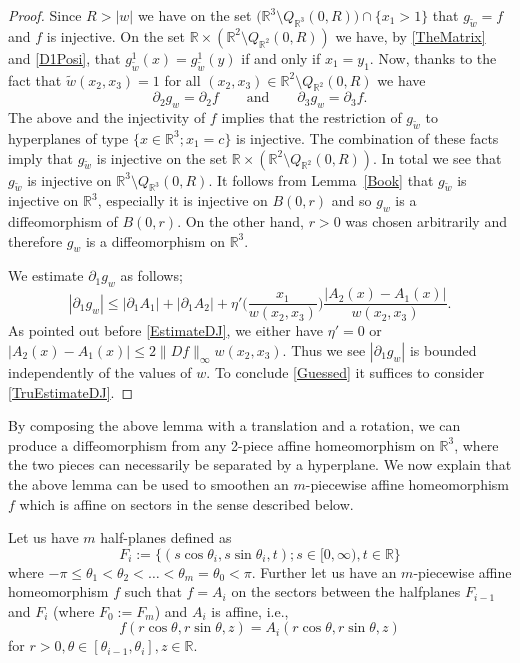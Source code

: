 \documentclass[12pt,a4paper]{amsart}
\theoremstyle{plain}
\theoremstyle{definition}
\numberwithin{equation}{section}
\def\er{\mathbb R}
\begin{document}
\begin{proof}
		Since $R > |w|$ we have on the set $\big(\er^3\setminus Q_{\er^3}(0,R)\big) \cap \{x_1>1\}$ that $g_{\tilde w} = f$ and $f$ is injective. On the set $\er\times(\er^2\setminus Q_{\er^2}(0,R))$ we have, by \eqref{TheMatrix} and  \eqref{D1Posi}, that $g_{\tilde{w}}^1(x) = g_{\tilde{w}}^1(y)$ if and only if $x_1 = y_1$. Now, thanks to the fact that $\tilde{w}(x_2,x_3) =1$ for all $(x_2,x_3)\in \er^2\setminus Q_{\er^2}(0,R)$ we have
		\begin{equation}\label{Sunlight}
			\partial_2 g_w = \partial_2f \qquad \text{and}\qquad \partial_3 g_w = \partial_3f.
		\end{equation}
		The above and the injectivity of $f$ implies that the restriction of $g_{\tilde{w}}$ to hyperplanes of type $\{x\in \er^3; x_1 = c\}$ is injective. The combination of these facts imply that $g_{\tilde{w}}$ is injective on the set $\er\times(\er^2\setminus Q_{\er^2}(0,R))$. In total we see that $g_{\tilde{w}}$ is injective on $\er^3\setminus Q_{\er^3}(0,R)$. It follows from Lemma~\ref{Book} that $g_{\tilde{w}}$ is injective on $\er^3$, especially it is injective on $B(0,r)$ and so $g_{w}$ is a diffeomorphism of $B(0,r)$. On the other hand, $r>0$ was chosen arbitrarily and therefore $g_w$ is a diffeomorphism on $\er^3$. 
		
		We estimate $\partial_1g_w$ as follows;
		$$
		|\partial_1g_w| \leq  |\partial_1 A_1|+ |\partial_1 A_2| +\eta'\Big(\frac{x_1}{w(x_2,x_3)}\Big)\frac{|A_2(x) - A_1(x)|}{w(x_2,x_3)}.
		$$
		As pointed out before \eqref{EstimateDJ}, we either have $\eta' = 0$ or $|A_2 (x) - A_1(x)|\leq 2\|Df\|_{\infty}w(x_2,x_3)$. Thus we see $|\partial_1g_w|$ is bounded independently of the values of $w$. To conclude \eqref{Guessed} it suffices to consider \eqref{TruEstimateDJ}. 
	\end{proof}
	
	By composing the above lemma with a translation and a rotation, we can produce a diffeomorphism from any 2-piece affine homeomorphism on $\er^3$, where the two pieces can necessarily be separated by a hyperplane. We now explain that the above lemma can be used to smoothen an $m$-piecewise affine homeomorphism $f$ which is affine on sectors in the sense described below. 
	
	
	Let us have $m$ half-planes defined as
	$$
	F_i:=\{(s\cos\theta_i, s\sin\theta_i, t); s\in[0,\infty), t\in \er\}
	$$
	where $-\pi\leq\theta_1< \theta_2 < \dots <\theta_m=\theta_0<\pi$. Further let us have an $m$-piecewise affine homeomorphism $f$ such that $f =A_i$ on the sectors between the halfplanes $F_{i-1}$ and $F_i$ (where $F_0:= F_m$) and $A_i$ is affine, i.e.,
	\begin{equation}\label{ThisIsEf}
			f(r\cos \theta, r\sin \theta,z) = A_i(r\cos \theta, r\sin \theta,z)
	\end{equation}
	for $r>0, \theta\in [\theta_{i-1},\theta_i], z\in \er.$
	
\end{document}
